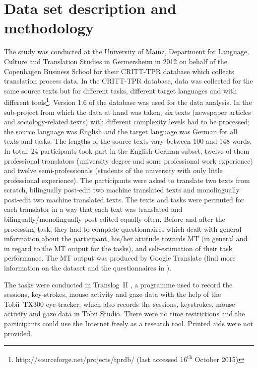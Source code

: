 \documentclass[output=paper]{langsci/langscibook}
\begin{document}
\section{Data set description and methodology\label{nitzke:sec:DataSetDescriptionAndMethodology}}

The study was conducted at the University of Mainz, Department for Language, Culture and Translation Studies in Germersheim in 2012 on behalf of the Copenhagen Business School for their CRITT-TPR database \citep{carl2012critt, carl2013} which collects translation process data. In the CRITT-TPR database, data was collected for the same source texts but for different tasks, different target languages and with different tools\footnote{http://sourceforge.net/projects/tprdb/ (last accessed 16\textsuperscript{th} October 2015)}. Version 1.6 of the database was used for the data analysis. In the sub-project from which the data at hand was taken, six texts (newspaper articles and sociology-related texts) with different complexity levels had to be processed; the source language was English and the target language was German for all texts and tasks. The lengths of the source texts vary between 100 and 148 words. In total, 24 participants took part in the English-German subset, twelve of them professional translators (university degree and some professional work experience) and twelve semi-professionals (students of the university with only little professional experience). The participants were asked to translate two texts from scratch, bilingually post-edit two machine translated texts and monolingually post-edit two machine translated texts. The texts and tasks were permuted for each translator in a way that each text was translated and bilingually/monolingually post-edited equally often. Before and after the processing task, they had to complete questionnaires which dealt with general information about the participant, his/her attitude towards MT (in general and in regard to the MT output for the tasks), and self-estimation of their task performance. The MT output was produced by Google Translate (find more information on the dataset and the questionnaires in \citealt{carl2014}).


The tasks were conducted in Translog~II \citep{jakobsen2011, carl2012translog}, a programme used to record the sessions, key-strokes, mouse activity and gaze data with the help of the Tobii~TX300 eye-tracker, which also records the sessions, keystrokes, mouse activity and gaze data in Tobii Studio. There were no time restrictions and the participants could use the Internet freely as a research tool. Printed aids were not provided.
\end{document}
